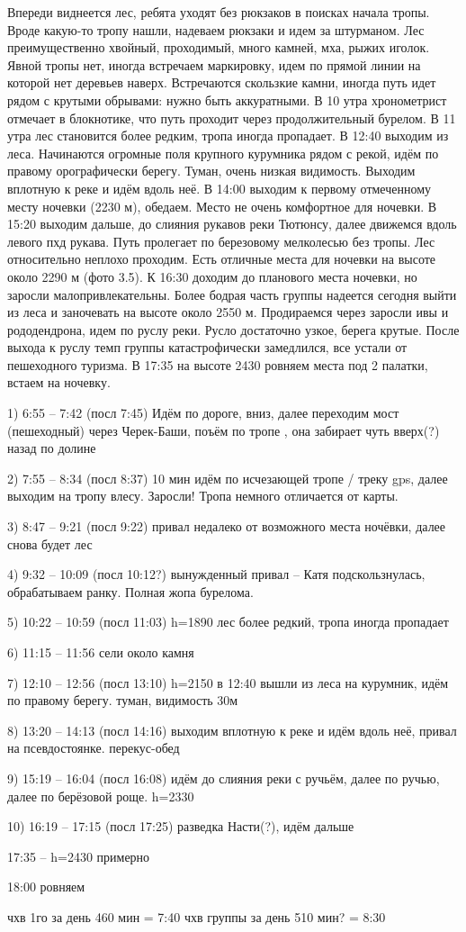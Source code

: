 Впереди виднеется лес, ребята уходят без рюкзаков в поисках начала тропы. Вроде какую-то тропу нашли, надеваем рюкзаки и идем за штурманом. Лес преимущественно хвойный, проходимый, много камней, мха, рыжих иголок. Явной тропы нет, иногда встречаем маркировку, идем по прямой линии на которой нет деревьев наверх. Встречаются скользкие камни, иногда путь идет рядом с крутыми обрывами: нужно быть аккуратными. В 10 утра хронометрист отмечает в блокнотике, что путь проходит через продолжительный бурелом. В 11 утра лес становится более редким, тропа иногда пропадает. В 12:40 выходим из леса. Начинаются огромные поля крупного курумника  рядом с рекой, идём по правому орографически берегу. Туман, очень низкая видимость. Выходим вплотную к реке и идём вдоль неё. В 14:00 выходим к первому отмеченному месту ночевки (2230 м), обедаем. Место не очень комфортное для ночевки. В 15:20 выходим дальше, до слияния рукавов реки Тютюнсу, далее движемся вдоль левого пхд рукава. Путь пролегает по березовому мелколесью без тропы. Лес относительно неплохо проходим. Есть отличные места для ночевки на высоте около 2290 м (фото 3.5). К 16:30 доходим до планового места ночевки, но заросли малопривлекательны. Более бодрая часть группы надеется сегодня выйти из леса и заночевать на высоте около 2550 м. Продираемся через заросли ивы и рододендрона, идем по руслу реки. Русло достаточно узкое, берега крутые. После выхода к руслу темп группы катастрофически замедлился, все устали от пешеходного туризма. В 17:35 на высоте 2430 ровняем места под 2 палатки, встаем на ночевку.


1)  6:55 -- 7:42 (посл 7:45) Идём по дороге, вниз, далее переходим мост (пешеходный) через Черек-Баши, поъём по тропе , она забирает чуть вверх(?) назад по долине

2) 7:55 -- 8:34 (посл 8:37) 10 мин идём по исчезающей тропе / треку gps, далее выходим на тропу влесу. Заросли! Тропа немного отличается от карты.

3) 8:47 -- 9:21 (посл 9:22) привал недалеко от возможного места ночёвки, далее снова будет лес

4) 9:32 -- 10:09 (посл 10:12?) вынужденный привал -- Катя подскользнулась, обрабатываем ранку. Полная жопа бурелома.

5) 10:22 -- 10:59 (посл 11:03) h=1890 лес более редкий, тропа иногда пропадает

6) 11:15 -- 11:56 сели около камня

7) 12:10 -- 12:56 (посл 13:10) h=2150 в 12:40 вышли из леса на курумник, идём по правому берегу. туман, видимость 30м

8) 13:20 -- 14:13 (посл 14:16) выходим вплотную к реке и идём вдоль неё, привал на псевдостоянке. перекус-обед

9) 15:19 -- 16:04 (посл 16:08) идём до слияния реки с ручьём, далее по ручью, далее по берёзовой роще. h=2330

10) 16:19 -- 17:15 (посл 17:25) разведка Насти(?), идём дальше

17:35 -- h=2430 примерно

18:00 ровняем

чхв 1го за день 460 мин = 7:40
чхв группы за день 510 мин? = 8:30


    \FloatBarrier
